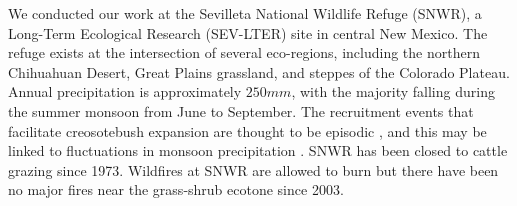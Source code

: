 \documentclass[11pt]{article}\usepackage[]{graphicx}\usepackage[usenames,dvipsnames]{xcolor}
\begin{document}
We conducted our work at the Sevilleta National Wildlife Refuge (SNWR), a Long-Term Ecological Research (SEV-LTER) site in central New Mexico.
The refuge exists at the intersection of several eco-regions, including the northern Chihuahuan Desert, Great Plains grassland, and steppes of the Colorado Plateau.
Annual precipitation is approximately $250 mm$, with the majority falling during the summer monsoon from June to September.
The recruitment events that facilitate creosotebush expansion are thought to be episodic \citep{peters2012long}, and this may be linked to fluctuations in monsoon precipitation \citep{boyd1983postdispersal, bowers2004temporal}.
SNWR has been closed to cattle grazing since 1973.
Wildfires at SNWR are allowed to burn but there have been no major fires near the grass-shrub ecotone since 2003.

\end{document}
